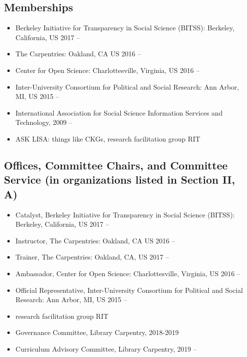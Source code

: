\subsection{Memberships}

\begin{itemize}[label={}]
  \item Berkeley Initiative for Transparency in Social Science (BITSS): Berkeley, California, US 2017 --
  \item The Carpentries: Oakland, CA US 2016 --
  \item Center for Open Science: Charlottesville, Virginia, US 2016 --
  \item Inter-University Consortium for Political and Social Research: Ann Arbor, MI, US 2015 --
  \item International Association for Social Science Information Services and Technology, 2009 --
  \item ASK LISA: things like CKGs, research facilitation group RIT
\end{itemize}

\subsection{Offices, Committee Chairs, and Committee Service (in organizations listed in Section II, A)}

\begin{itemize}[label={}]
    \item Catalyst, Berkeley Initiative for Transparency in Social Science (BITSS): Berkeley, California, US 2017 --
    \item Instructor, The Carpentries: Oakland, CA US 2016 --
    \item Trainer, The Carpentries: Oakland, CA, US  2017 --
    \item Ambassador, Center for Open Science: Charlottesville, Virginia, US 2016 --
    \item Official Representative, Inter-University Consortium for Political and Social Research: Ann Arbor, MI, US 2015 --
    \item research facilitation group RIT
    \item Governance Committee, Library Carpentry, 2018-2019
    \item Curriculum Advisory Committee, Library Carpentry, 2019 --
\end{itemize}

